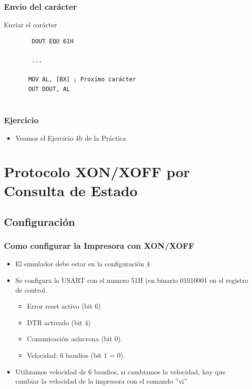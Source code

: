 \documentclass{beamer}
\begin{document}
\begin{frame}[fragile]
\frametitle{Envio del carácter}
\begin{block}{Enviar el carácter}
 \begin{verbatim}
        DOUT EQU 61H
         
        ...
           
       MOV AL, [BX] ; Proximo carácter
       OUT DOUT, AL
             
 \end{verbatim}
\end{block}

\end{frame}


\begin{frame}[fragile]
\frametitle{Ejercicio}

\begin{itemize}
 \item Veamos el Ejercicio 4b de la Práctica
\end{itemize}

\end{frame}

\section{Protocolo XON/XOFF por Consulta de Estado}

\subsection{Configuración}

\begin{frame}[fragile]
\frametitle{Como configurar la Impresora con XON/XOFF}
\begin{itemize}
 \item El simulador debe estar en la configuración 4
 \item Se configura la USART con el numero 51H (en binario 01010001 en el registro de control.
 \begin{itemize}
 \item Error reset activo (bit 6)
 \item DTR activado (bit 4)
 \item Comunicación asíncrona (bit 0). 
 \item Velocidad: 6 baudios (bit 1 = 0).
\end{itemize}
\item Utilizamos velocidad de 6 baudios, si cambiamos la velocidad, hay que cambiar la velocidad de la impresora con el comando ''vi''
 \end{itemize}
\end{frame}
\end{document}
